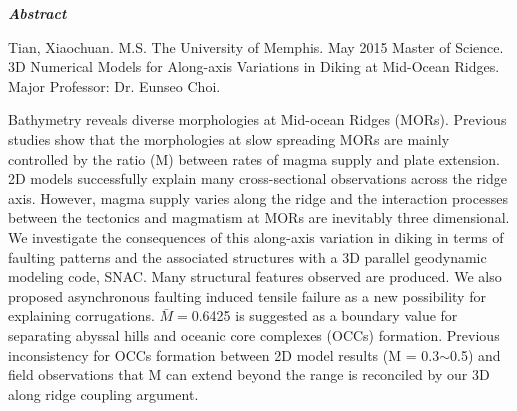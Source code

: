 \begin{center}
\textbf{\textit{Abstract}}
\end{center}

\vspace{0.5cm}

\begin{singlespace*}
Tian, Xiaochuan. M.S. The University of Memphis. May 2015 Master of Science. 3D Numerical Models for Along-axis Variations in Diking at Mid-Ocean Ridges. Major Professor: Dr. Eunseo Choi.
\end{singlespace*}

\vspace{0.5cm}

Bathymetry reveals diverse morphologies at Mid-ocean Ridges (MORs). Previous studies show that the morphologies at slow spreading MORs are mainly controlled by the ratio (M) between rates of magma supply and plate extension. 2D models successfully explain many cross-sectional observations across the ridge axis. However, magma supply varies along the ridge and the interaction processes between the tectonics and magmatism at MORs are inevitably three dimensional. We investigate the consequences of this along-axis variation in diking in terms of faulting patterns and the associated structures with a 3D parallel geodynamic modeling code, SNAC. Many structural features observed are produced. We also proposed asynchronous faulting induced tensile failure as a new possibility for explaining corrugations. $\bar{M} =$0.6425 is suggested as a boundary value for separating abyssal hills and oceanic core complexes (OCCs) formation. Previous inconsistency for OCCs formation between 2D model results (M = 0.3$\sim$0.5) and field observations that M can extend beyond the range is reconciled by our 3D along ridge coupling argument.  

